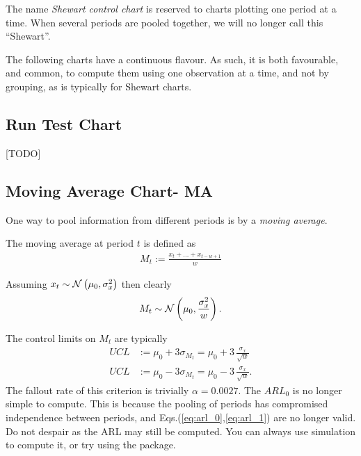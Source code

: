 \begin{remark}
The name \emph{Shewart control chart} is reserved to charts plotting one period at a time. 
When several periods are pooled together, we will no longer call this  ``Shewart''.
\end{remark}

\begin{remark}
The following charts have a continuous flavour. As such, it is both favourable, and common, to compute them using one observation at a time, and not by grouping, as is typically for Shewart charts. 
\end{remark}



\subsection{Run Test Chart}
[TODO]




\subsection{Moving Average Chart- MA}
One way to pool information from different periods is by a \emph{moving average}.
\begin{definition}
The moving average at period $t$ is defined as
\begin{align}
	M_t:= \frac{x_t+\dots+x_{t-w+1}}{w}
\end{align}
\end{definition}
Assuming $x_t \sim \mathcal{N}\left(\mu_0, \sigma_x^2\right)$ then clearly 
\begin{align}
	M_t \sim \mathcal{N}\left(\mu_0, \frac{\sigma_x^2}{w}\right).
\end{align}

The control limits on $M_t$ are typically
\begin{align}
	UCL &:= \mu_0 + 3 \sigma_{M_t}= \mu_0 + 3 \, \frac{\sigma_x}{\sqrt{w}} \\
	UCL &:= \mu_0 - 3 \sigma_{M_t}= \mu_0 - 3 \, \frac{\sigma_x}{\sqrt{w}}.
\end{align}
The fallout rate of this criterion is trivially $\alpha=0.0027$. 
The $ARL_0$ is no longer simple to compute. 
This is because the pooling of periods has compromised independence between periods, and Eqs.(\ref{eq:arl_0},\ref{eq:arl_1}) are no longer valid. 
Do not despair as the ARL may still be computed. 
You can always use simulation to compute it, or try using the  \R package.


